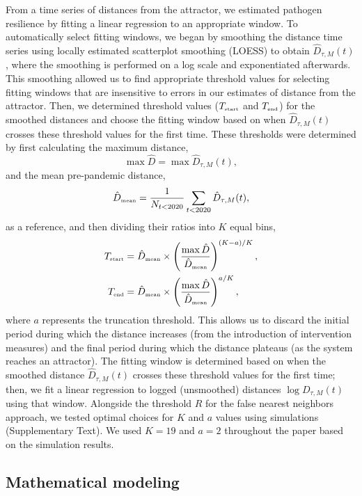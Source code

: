 \documentclass[12pt]{article}
\newcommand{\tsub}[2]{#1_{{\textrm{\tiny #2}}}}
\begin{document}
From a time series of distances from the attractor, we estimated pathogen resilience by fitting a linear regression to an appropriate window.
To automatically select fitting windows, we began by smoothing the distance time series using locally estimated scatterplot smoothing (LOESS) to obtain $\hat{D}_{\tau,M}(t)$, where the smoothing is performed on a log scale and exponentiated afterwards.
This smoothing allowed us to find appropriate threshold values for selecting fitting windows that are insensitive to errors in our estimates of distance from the attractor.
Then, we determined threshold values ($\tsub{T}{start}$ and $\tsub{T}{end}$) for the smoothed distances and choose the fitting window based on when $\hat{D}_{\tau,M}(t)$ crosses these threshold values for the first time.
These thresholds were determined by first calculating the maximum distance,
\begin{equation}
\max \hat{D} = \max \hat{D}_{\tau,M}(t),
\end{equation}
and the mean pre-pandemic distance,
\begin{equation}
\tsub{\hat{D}}{mean} = \frac{1}{N_{t<2020}} \sum_{t < 2020} \hat{D}_{\tau,M}(t),
\end{equation}
as a reference, and then dividing their ratios into $K$ equal bins,
\begin{align}
\tsub{T}{start} &= \tsub{\hat{D}}{mean} \times \left(\frac{\max \hat{D}}{\tsub{\hat{D}}{mean}} \right)^{(K-a)/K},\\
\tsub{T}{end} &= \tsub{\hat{D}}{mean} \times \left(\frac{\max \hat{D}}{\tsub{\hat{D}}{mean}} \right)^{a/K},
\end{align}
where $a$ represents the truncation threshold.
This allows us to discard the initial period during which the distance increases (from the introduction of intervention measures) and the final period during which the distance plateaus (as the system reaches an attractor).
The fitting window is determined based on when the smoothed distance $\hat{D}_{\tau,M}(t)$ crosses these threshold values for the first time; then, we fit a linear regression to logged (unsmoothed) distances $\log D_{\tau,M}(t)$ using that window.
Alongside the threshold $R$ for the false nearest neighbors approach, we tested optimal choices for $K$ and $a$ values using simulations (Supplementary Text).
We used $K=19$ and $a=2$ throughout the paper based on the simulation results.

\subsection*{Mathematical modeling}
\end{document}

